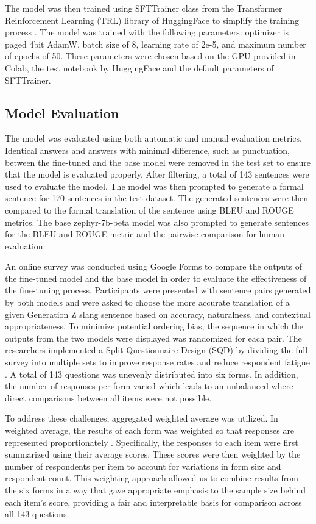 The model was then trained using SFTTrainer class from the Transformer Reinforcement Learning (TRL) library of HuggingFace to simplify the training process \cite{vonwerra2022trl}. The model was trained with the following parameters: optimizer is paged 4bit AdamW, batch size of 8, learning rate of 2e-5, and maximum number of epochs of 50. These parameters were chosen based on the GPU provided in Colab, the test notebook by HuggingFace and the default parameters of SFTTrainer.

\subsection{Model Evaluation}
The model was evaluated using both automatic and manual evaluation metrics. Identical answers and answers with minimal difference, such as punctuation, between the fine-tuned and the base model were removed in the test set to ensure that the model is evaluated properly. After filtering, a total of 143 sentences were used to evaluate the model. The model was then prompted to generate a formal sentence for 170 sentences in the test dataset. The generated sentences were then compared to the formal translation of the sentence using BLEU and ROUGE metrics. The base zephyr-7b-beta model was also prompted to generate sentences for the BLEU and ROUGE metric and the pairwise comparison for human evaluation. 

An online survey was conducted using Google Forms to compare the outputs of the fine-tuned model and the base model in order to evaluate the effectiveness of the fine-tuning process. Participants were presented with sentence pairs generated by both models and were asked to choose the more accurate translation of a given Generation Z slang sentence based on accuracy, naturalness, and contextual appropriateness. To minimize potential ordering bias, the sequence in which the outputs from the two models were displayed was randomized for each pair. The researchers implemented a Split Questionnaire Design (SQD) by dividing the full survey into multiple sets to improve response rates and reduce respondent fatigue \cite{Peytchev_Peytcheva_2017}. A total of 143 questions was unevenly distributed into six forms. In addition, the number of responses per form varied which leads to an unbalanced where direct comparisons between all items were not possible.

To address these challenges, aggregated weighted average was utilized. In weighted average, the results of each form was weighted so that responses are represented proportionately \cite{Ganti_2024}. Specifically, the responses to each item were first summarized using their average scores. These scores were then weighted by the number of respondents per item to account for variations in form size and respondent count. This weighting approach allowed us to combine results from the six forms in a way that gave appropriate emphasis to the sample size behind each item’s score, providing a fair and interpretable basis for comparison across all 143 questions.

